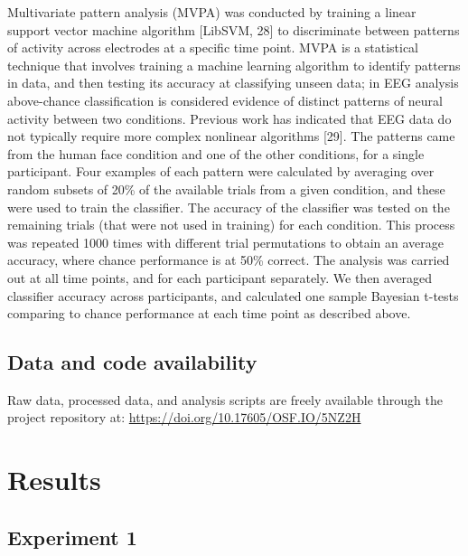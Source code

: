 \documentclass[
]{article}
\begin{document}
Multivariate pattern analysis (MVPA) was conducted by training a linear support vector machine algorithm {[}LibSVM, 28{]} to discriminate between patterns of activity across electrodes at a specific time point. MVPA is a statistical technique that involves training a machine learning algorithm to identify patterns in data, and then testing its accuracy at classifying unseen data; in EEG analysis above-chance classification is considered evidence of distinct patterns of neural activity between two conditions. Previous work has indicated that EEG data do not typically require more complex nonlinear algorithms {[}29{]}. The patterns came from the human face condition and one of the other conditions, for a single participant. Four examples of each pattern were calculated by averaging over random subsets of 20\% of the available trials from a given condition, and these were used to train the classifier. The accuracy of the classifier was tested on the remaining trials (that were not used in training) for each condition. This process was repeated 1000 times with different trial permutations to obtain an average accuracy, where chance performance is at 50\% correct. The analysis was carried out at all time points, and for each participant separately. We then averaged classifier accuracy across participants, and calculated one sample Bayesian t-tests comparing to chance performance at each time point as described above.

\subsection{Data and code availability}\label{data-and-code-availability}

Raw data, processed data, and analysis scripts are freely available through the project repository at: \url{https://doi.org/10.17605/OSF.IO/5NZ2H}

\section{Results}\label{results}

\subsection{Experiment 1}\label{experiment-1}
\end{document}
